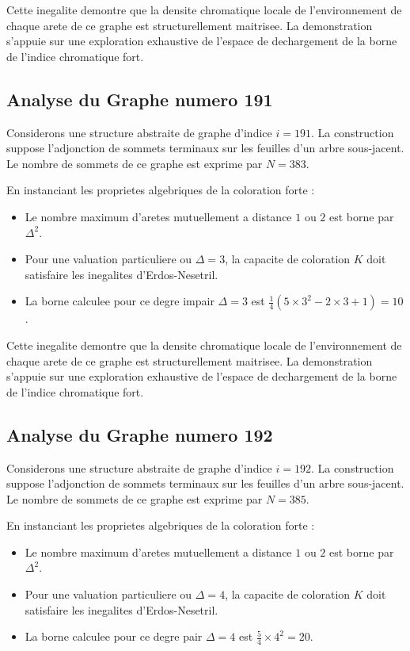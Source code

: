 \documentclass[11pt,a4paper]{article}
\begin{document}
Cette inegalite demontre que la densite chromatique locale de l'environnement de chaque arete de ce graphe est structurellement maitrisee. La demonstration s'appuie sur une exploration exhaustive de l'espace de dechargement de la borne de l'indice chromatique fort.

\subsection{Analyse du Graphe numero 191}
Considerons une structure abstraite de graphe d'indice $i = 191$. La construction suppose l'adjonction de sommets terminaux sur les feuilles d'un arbre sous-jacent. Le nombre de sommets de ce graphe est exprime par $N = 383$.

En instanciant les proprietes algebriques de la coloration forte :
\begin{itemize}
\item Le nombre maximum d'aretes mutuellement a distance $1$ ou $2$ est borne par $\Delta^2$.
\item Pour une valuation particuliere ou $\Delta = 3$, la capacite de coloration $K$ doit satisfaire les inegalites d'Erdos-Nesetril.
\item La borne calculee pour ce degre impair $\Delta = 3$ est $\frac{1}{4}(5 \times 3^2 - 2 \times 3 + 1) = 10$.
\end{itemize}

Cette inegalite demontre que la densite chromatique locale de l'environnement de chaque arete de ce graphe est structurellement maitrisee. La demonstration s'appuie sur une exploration exhaustive de l'espace de dechargement de la borne de l'indice chromatique fort.

\subsection{Analyse du Graphe numero 192}
Considerons une structure abstraite de graphe d'indice $i = 192$. La construction suppose l'adjonction de sommets terminaux sur les feuilles d'un arbre sous-jacent. Le nombre de sommets de ce graphe est exprime par $N = 385$.

En instanciant les proprietes algebriques de la coloration forte :
\begin{itemize}
\item Le nombre maximum d'aretes mutuellement a distance $1$ ou $2$ est borne par $\Delta^2$.
\item Pour une valuation particuliere ou $\Delta = 4$, la capacite de coloration $K$ doit satisfaire les inegalites d'Erdos-Nesetril.
\item La borne calculee pour ce degre pair $\Delta = 4$ est $\frac{5}{4} \times 4^2 = 20$.
\end{itemize}
\end{document}
